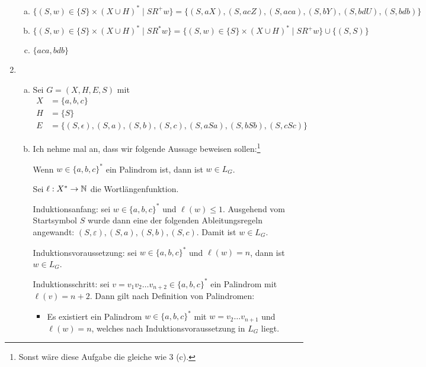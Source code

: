 \begin{enumerate}[1.]
\begin{enumerate}[(a)]
      \item $\{ (S, w) \in \{ S \} \times {(X \cup H)}^* \mid S R^+ w\}
        = \{ (S, aX), (S, acZ), (S, aca), (S, bY), (S, bdU), (S, bdb) \}$

      \item $\{ (S, w) \in \{ S \} \times {(X \cup H)}^* \mid S R^* w\}
        = \{ (S, w) \in \{ S \} \times {(X \cup H)}^* \mid S R^+ w\}
        \cup \{ (S,S) \}$
      \item $\{ aca, bdb \}$
    \end{enumerate}

  \item
    \begin{enumerate}[(a)]
      \item Sei $G = (X, H, E, S)$ mit
        \begin{align*}
          X & = \{a, b, c\}\\
          H & = \{ S \}\\
          E & = \{
            (S, \epsilon),
          (S, a), (S, b), (S, c),
          (S, aSa), (S, bSb), (S, cSc)
          \}
        \end{align*}

      \item Ich nehme mal an, dass wir folgende Aussage beweisen
        sollen:\footnote{Sonst wäre diese Aufgabe die gleiche wie 3 (c).}
        \begin{center}
          Wenn $w \in {\{a, b, c\}}^*$ ein Palindrom ist, dann ist $w \in L_G$.
        \end{center}
        Sei $\ell: X^* \rightarrow \mathbb{N}$ die Wortlängenfunktion.

        Induktionsanfang: sei $w \in {\{a, b, c\}}^*$ und $\ell(w) \leq 1$.
        Ausgehend vom Startsymbol $S$ wurde dann eine der folgenden
        Ableitungsregeln angewandt: $(S, \varepsilon), (S, a), (S, b), (S, c)$.
        Damit ist $w \in L_G$.

        Induktionsvoraussetzung: sei $w \in {\{a, b, c\}}^*$ und $\ell(w) = n$,
        dann ist $w \in L_G$.

        Induktionsschritt: sei $v = v_1 v_2 \ldots v_{n+2} \in {\{a, b, c\}}^*$
        ein Palindrom mit $\ell(v) = n+2$. Dann gilt nach Definition von
        Palindromen:
        \begin{itemize}
          \item Es existiert ein Palindrom $w \in {\{a, b, c\}}^*$ mit $w = v_2
            \ldots v_{n+1}$ und $\ell(w) = n$, welches nach
            Induktionsvoraussetzung in $L_G$ liegt.


\end{itemize}
\end{enumerate}
\end{enumerate}
